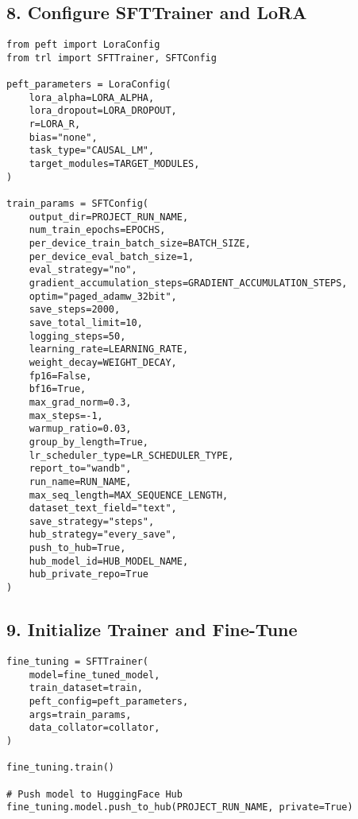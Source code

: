 \documentclass[a4paper, 12pt]{article}
\begin{document}
\subsection*{8. Configure SFTTrainer and LoRA}
\begin{tcolorbox}[colback=blue!5!white, colframe=blue!75!black, title=SFTTrainer Configuration]
\begin{verbatim}
from peft import LoraConfig
from trl import SFTTrainer, SFTConfig

peft_parameters = LoraConfig(
    lora_alpha=LORA_ALPHA,
    lora_dropout=LORA_DROPOUT,
    r=LORA_R,
    bias="none",
    task_type="CAUSAL_LM",
    target_modules=TARGET_MODULES,
)

train_params = SFTConfig(
    output_dir=PROJECT_RUN_NAME,
    num_train_epochs=EPOCHS,
    per_device_train_batch_size=BATCH_SIZE,
    per_device_eval_batch_size=1,
    eval_strategy="no",
    gradient_accumulation_steps=GRADIENT_ACCUMULATION_STEPS,
    optim="paged_adamw_32bit",
    save_steps=2000,
    save_total_limit=10,
    logging_steps=50,
    learning_rate=LEARNING_RATE,
    weight_decay=WEIGHT_DECAY,
    fp16=False,
    bf16=True,
    max_grad_norm=0.3,
    max_steps=-1,
    warmup_ratio=0.03,
    group_by_length=True,
    lr_scheduler_type=LR_SCHEDULER_TYPE,
    report_to="wandb",
    run_name=RUN_NAME,
    max_seq_length=MAX_SEQUENCE_LENGTH,
    dataset_text_field="text",
    save_strategy="steps",
    hub_strategy="every_save",
    push_to_hub=True,
    hub_model_id=HUB_MODEL_NAME,
    hub_private_repo=True
)
\end{verbatim}
\end{tcolorbox}

\subsection*{9. Initialize Trainer and Fine-Tune}
\begin{tcolorbox}[colback=yellow!5!white, colframe=yellow!75!black, title=Fine-Tuning]
\begin{verbatim}
fine_tuning = SFTTrainer(
    model=fine_tuned_model,
    train_dataset=train,
    peft_config=peft_parameters,
    args=train_params,
    data_collator=collator,
)

fine_tuning.train()

# Push model to HuggingFace Hub
fine_tuning.model.push_to_hub(PROJECT_RUN_NAME, private=True)
\end{verbatim}
\end{tcolorbox}
\end{document}

